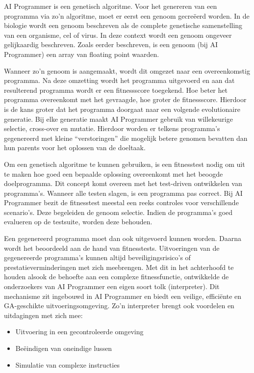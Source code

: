 AI Programmer is een genetisch algoritme. Voor het genereren van een programma via zo'n algoritme, moet er eerst een genoom gecreëerd worden. In de biologie wordt een genoom beschreven als de complete genetische samenstelling van een organisme, cel of virus. In deze context wordt een genoom ongeveer gelijkaardig beschreven. Zoals eerder beschreven, is een genoom (bij AI Programmer) een array van floating point waarden. 

Wanneer zo’n genoom is aangemaakt, wordt dit omgezet naar een overeenkomstig programma. Na deze omzetting wordt het programma uitgevoerd en aan dat resulterend programma wordt er een fitnessscore toegekend. Hoe beter het programma overeenkomt met het gevraagde, hoe groter de fitnessscore. Hierdoor is de kans groter dat het programma doorgaat naar een volgende evolutionaire generatie. Bij elke generatie maakt AI Programmer gebruik van willekeurige selectie, cross-over en mutatie. Hierdoor worden er telkens programma’s gegenereerd met kleine “verstoringen” die mogelijk betere genomen bevatten dan hun parents voor het oplossen van de doeltaak.

Om een genetisch algoritme te kunnen gebruiken, is een fitnesstest nodig om uit te maken hoe  goed een bepaalde oplossing overeenkomt met het beoogde doelprogramma. Dit concept komt overeen met het test-driven ontwikkelen van programma’s. Wanneer alle testen slagen, is een programma pas correct. Bij AI Programmer bezit de fitnesstest meestal een reeks controles voor verschillende scenario’s. Deze begeleiden de genoom selectie. Indien de programma’s goed evalueren op de testsuite, worden deze behouden.

Een gegenereerd programma moet dan ook uitgevoerd kunnen worden. Daarna wordt het beoordeeld aan de hand van fitnesstests. Uitvoeringen van de gegenereerde programma’s kunnen altijd beveiligingsrisico’s of prestatieverminderingen met zich meebrengen. Met dit in het achterhoofd te houden alsook de behoefte aan een complexe fitnessfunctie, ontwikkelde de onderzoekers van AI Programmer een eigen soort tolk (interpreter). Dit mechanisme zit ingebouwd in AI Programmer en biedt een veilige, efficiënte en GA-geschikte uitvoeringsomgeving. Zo’n interpreter brengt ook voordelen en uitdagingen met zich mee:

\begin{itemize}
	\item Uitvoering in een gecontroleerde omgeving
	\item Beëindigen van oneindige lussen
	\item Simulatie van complexe instructies
\end{itemize}

